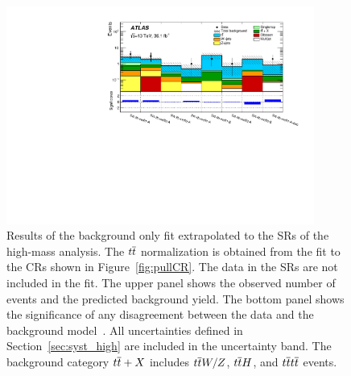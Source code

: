 \begin{figure}[htbp]
	\centering
	\includegraphics[width=0.9\textwidth]{figures/ewk_prod/etmiss_results/histpull_pulls_in_SR_qcdStrong}
	\caption{Results of the background only fit extrapolated to the SRs of the high-mass analysis. The $t\overline{t}$ normalization
                is obtained from the fit to the CRs shown in Figure~\ref{fig:pullCR}. The data in the  SRs are 
	not included in the fit.  The upper panel shows the observed number of events and the predicted background 
	yield.  The bottom panel shows the significance of any disagreement between the data and the background model~\cite{Choudalakis2012}. All uncertainties  defined in Section~\ref{sec:syst_high} are included in the uncertainty band. The background
	category $t\overline{t}+X$ includes $t\overline{t} W/Z$, $t\overline{t} H$, and $t\overline{t} t\overline{t}$ events.} 
	\label{fig:pullSR}
\end{figure}

